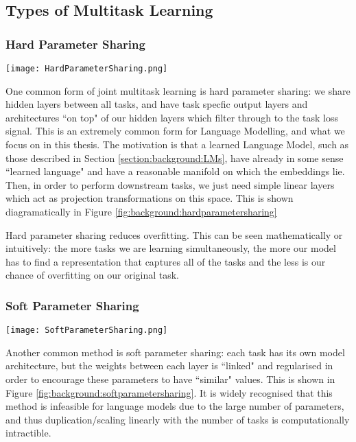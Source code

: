 {{\subsection{Types of Multitask Learning}
\subsubsection{Hard Parameter Sharing}
\begin{center}
	\texttt{[image: HardParameterSharing.png]}
	\label{fig:background:hardparametersharing}
\end{center}

One common form of joint multitask learning is hard parameter sharing: we share hidden layers between all tasks, and have task specfic output layers and architectures ``on top" of our hidden layers which filter through to the task loss signal. This is an extremely common form for Language Modelling, and what we focus on in this thesis. The motivation is that a learned Language Model, such as those described in Section \ref{section:background:LMs}, have already in some sense ``learned language" and have a reasonable manifold on which the embeddings lie. Then, in order to perform downstream tasks, we just need simple linear layers which act as projection transformations on this space. This is shown diagramatically in Figure \ref{fig:background:hardparametersharing}

Hard parameter sharing reduces overfitting. This can be seen mathematically \cite{Baxter1997} or intuitively: the more tasks we are learning simultaneously, the more our model has to find a representation that captures all of the tasks and the less is our chance of overfitting on our original task.

\subsubsection{Soft Parameter Sharing}
\begin{center}
	\texttt{[image: SoftParameterSharing.png]}
	\label{fig:background:softparametersharing}
\end{center}

Another common method is soft parameter sharing: each task has its own model architecture, but the weights between each layer is ``linked" and regularised in order to encourage these parameters to have ``similar" values. This is shown in Figure \ref{fig:background:softparametersharing}. It is widely recognised that this method is infeasible for language models due to the large number of parameters, and thus duplication/scaling linearly with the number of tasks is computationally intractible.

}}
